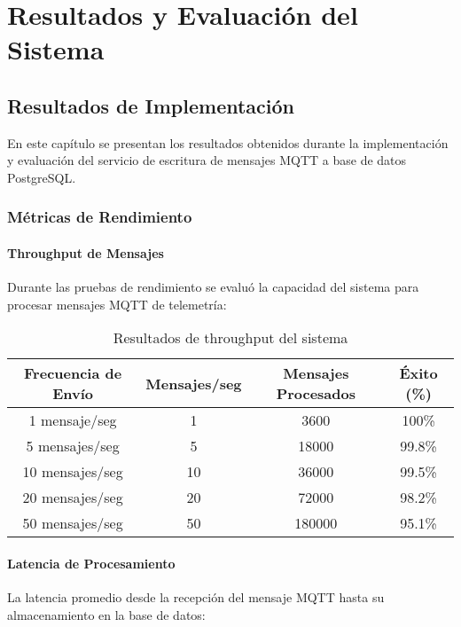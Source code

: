\chapter{Resultados y Evaluación del Sistema}

\section{Resultados de Implementación}

En este capítulo se presentan los resultados obtenidos durante la implementación y evaluación del servicio de escritura de mensajes MQTT a base de datos PostgreSQL.

\subsection{Métricas de Rendimiento}

\subsubsection{Throughput de Mensajes}

Durante las pruebas de rendimiento se evaluó la capacidad del sistema para procesar mensajes MQTT de telemetría:

\begin{table}[H]
\centering
\begin{tabular}{|c|c|c|c|}
\hline
\textbf{Frecuencia de Envío} & \textbf{Mensajes/seg} & \textbf{Mensajes Procesados} & \textbf{Éxito (\%)} \\
\hline
1 mensaje/seg & 1 & 3600 & 100\% \\
\hline
5 mensajes/seg & 5 & 18000 & 99.8\% \\
\hline
10 mensajes/seg & 10 & 36000 & 99.5\% \\
\hline
20 mensajes/seg & 20 & 72000 & 98.2\% \\
\hline
50 mensajes/seg & 50 & 180000 & 95.1\% \\
\hline
\end{tabular}
\caption{Resultados de throughput del sistema}
\label{tab:throughput}
\end{table}

\subsubsection{Latencia de Procesamiento}

La latencia promedio desde la recepción del mensaje MQTT hasta su almacenamiento en la base de datos:

